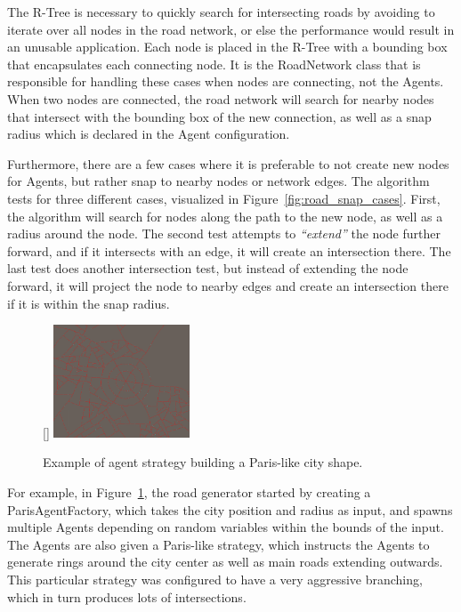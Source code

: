 The R-Tree is necessary to quickly search for intersecting roads by avoiding to iterate over all nodes in the road network, or else the performance would result in an unusable application.
Each node is placed in the R-Tree with a bounding box that encapsulates each connecting node.
It is the RoadNetwork class that is responsible for handling these cases when nodes are connecting, not the Agents.
When two nodes are connected, the road network will search for nearby nodes that intersect with the bounding box of the new connection, as well as a snap radius which is declared in the Agent configuration.

Furthermore, there are a few cases where it is preferable to not create new nodes for Agents, but rather snap to nearby nodes or network edges.
The algorithm tests for three different cases, visualized in Figure~\ref{fig:road_snap_cases}.
First, the algorithm will search for nodes along the path to the new node, as well as a radius around the node.
The second test attempts to \textit{``extend''} the node further forward, and if it intersects with an edge, it will create an intersection there.
The last test does another intersection test, but instead of extending the node forward, it will project the node to nearby edges and create an intersection there if it is within the snap radius.

\begin{figure}
  \centering
  \raisebox{0pt}[\dimexpr{}\baselineskip\relax]{
    \includegraphics[width=0.36\textwidth]{figure/road_network_paris.png}
  }
  \caption{Example of agent strategy building a Paris-like city shape.}

  \label{fig:road_network_paris}
\end{figure}

For example, in Figure~\ref{fig:road_network_paris}, the road generator started by creating a ParisAgentFactory, which takes the city position and radius as input, and spawns multiple Agents depending on random variables within the bounds of the input.
The Agents are also given a Paris-like strategy, which instructs the Agents to generate rings around the city center as well as main roads extending outwards.
This particular strategy was configured to have a very aggressive branching, which in turn produces lots of intersections.


